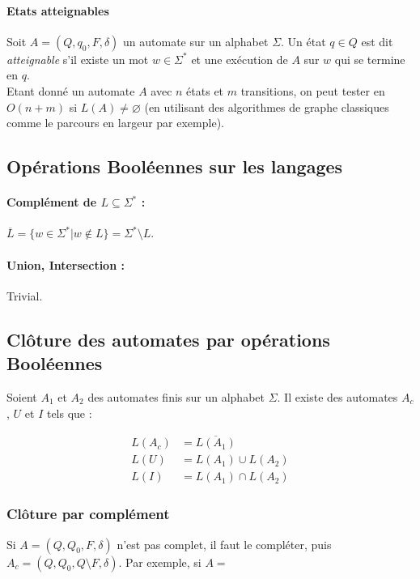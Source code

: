 \documentclass[a4paper]{article}
\begin{document}
  \paragraph{Etats atteignables} Soit $A = (Q, q_0, F, \delta)$ un 
automate sur un
  alphabet $\Sigma$. Un état $q\in Q$ est dit \textit{atteignable} s'il 
existe
  un mot $w \in \Sigma^*$ et une exécution de $A$ sur $w$ qui se termine 
en $q$.\\

  Etant donné un automate $A$ avec $n$ états et $m$ transitions, on peut 
tester
  en $O(n+m)$ si $L(A) \neq \varnothing$ (en utilisant des algorithmes 
de graphe
  classiques comme le parcours en largeur par exemple).

  \subsection{Opérations Booléennes sur les langages}
  \paragraph{Complément de $L \subseteq \Sigma^*$ :} $\overline{L} = \{ 
w \in \Sigma^* | w \not \in L\} = \Sigma^* \setminus L$.

  \paragraph{Union, Intersection :} Trivial.

  \subsection{Clôture des automates par opérations Booléennes}
  Soient $A_1$ et $A_2$ des automates finis sur un alphabet $\Sigma$. Il 
existe
  des automates $A_c$, $U$ et $I$ tels que :
  \begin{center}
    \begin{align*}
      L(A_c) & = \overline{L(A_1)}\\
      L(U) & = L(A_1) \cup L(A_2)\\
      L(I) & = L(A_1) \cap L(A_2)
    \end{align*}
  \end{center}

  \subsubsection{Clôture par complément}
  Si $A = (Q, Q_0, F, \delta)$ n'est pas complet, il faut le compléter, 
puis
  $A_c = (Q, Q_0, Q \setminus F, \delta)$. Par exemple, si $A = $
\end{document}
